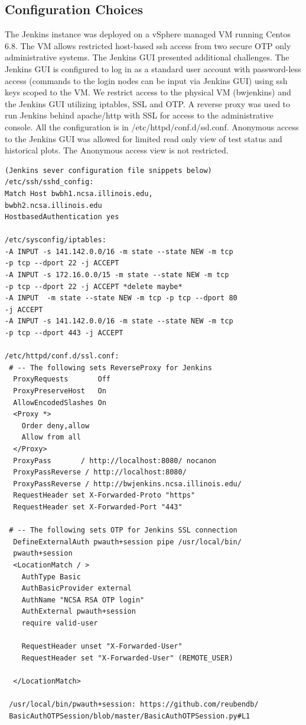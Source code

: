 \documentclass[10pt, conference, compsocconf]{IEEEtran}
\begin{document}
\subsection{Configuration Choices}
The Jenkins instance was deployed on a vSphere managed VM running Centos 6.8. The VM allows restricted host-based ssh access from two secure OTP only administrative systems. The Jenkins GUI presented additional challenges. The Jenkins GUI is configured to log in as a standard user account with password-less access (commands to the login nodes can be input via Jenkins GUI) using ssh keys scoped to the VM. We restrict access to the physical VM (bwjenkins) and the Jenkins GUI utilizing iptables, SSL and OTP.  A reverse proxy was used to run Jenkins behind apache/http with SSL for access to the administrative console. All the configuration is in /etc/httpd/conf.d/ssl.conf. Anonymous access to the Jenkins GUI was allowed for limited read only view of test status and historical plots. The Anonymous access view is not restricted. 

\begin{lstlisting}
(Jenkins sever configuration file snippets below)
/etc/ssh/sshd_config:
Match Host bwbh1.ncsa.illinois.edu,
bwbh2.ncsa.illinois.edu
HostbasedAuthentication yes

/etc/sysconfig/iptables:
-A INPUT -s 141.142.0.0/16 -m state --state NEW -m tcp 
-p tcp --dport 22 -j ACCEPT
-A INPUT -s 172.16.0.0/15 -m state --state NEW -m tcp 
-p tcp --dport 22 -j ACCEPT *delete maybe*
-A INPUT  -m state --state NEW -m tcp -p tcp --dport 80 
-j ACCEPT
-A INPUT -s 141.142.0.0/16 -m state --state NEW -m tcp 
-p tcp --dport 443 -j ACCEPT

/etc/httpd/conf.d/ssl.conf:
 # -- The following sets ReverseProxy for Jenkins
  ProxyRequests       Off
  ProxyPreserveHost   On
  AllowEncodedSlashes On
  <Proxy *>
    Order deny,allow
    Allow from all
  </Proxy>
  ProxyPass       / http://localhost:8080/ nocanon
  ProxyPassReverse / http://localhost:8080/
  ProxyPassReverse / http://bwjenkins.ncsa.illinois.edu/
  RequestHeader set X-Forwarded-Proto "https"
  RequestHeader set X-Forwarded-Port "443"

 # -- The following sets OTP for Jenkins SSL connection
  DefineExternalAuth pwauth+session pipe /usr/local/bin/
  pwauth+session
  <LocationMatch / > 
    AuthType Basic
    AuthBasicProvider external
    AuthName "NCSA RSA OTP login" 
    AuthExternal pwauth+session
    require valid-user
    
    RequestHeader unset "X-Forwarded-User"
    RequestHeader set "X-Forwarded-User" (REMOTE_USER)

  </LocationMatch>
  
 /usr/local/bin/pwauth+session: https://github.com/reubendb/
 BasicAuthOTPSession/blob/master/BasicAuthOTPSession.py#L1
\end{lstlisting}
\end{document}
